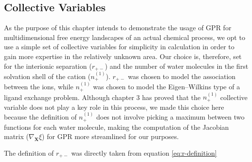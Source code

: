 \begin{spacing}{2.0}
    \subsection{Collective Variables}

    As the purpose of this chapter intends to demonstrate the usage of GPR for multidimensional free energy landscapes of an actual chemical 
    process, we opt to use a simple set of collective variables for simplicity in calculation in order to gain more expertise in the relatively
    unknown area. Our choice is, therefore, set for the interionic separation ($r_{+-}$) and the number of water molecules in the first solvation
    shell of the cation ($n_{+}^{(1)}$). $r_{+-}$ was chosen to model the association between the ions, while $n_{+}^{(1)}$ was chosen to model
    the Eigen--Wilkins type of a ligand exchange problem. Although chapter 3 has proved that the $n_{+}^{(1)}$ collective variable does not
    play a key role in this process, we made this choice here because the definition of $n_{+}^{(1)}$ does not involve picking a maximum between
    two functions for each water molecule, making the computation of the Jacobian matrix ($\nabla_{\mathbf{X}}\xi$) for GPR more streamlined 
    for our purposes.
    
    The definition of $r_{+-}$ was directly taken from equation \ref{eq:r-definition}
\end{spacing}

